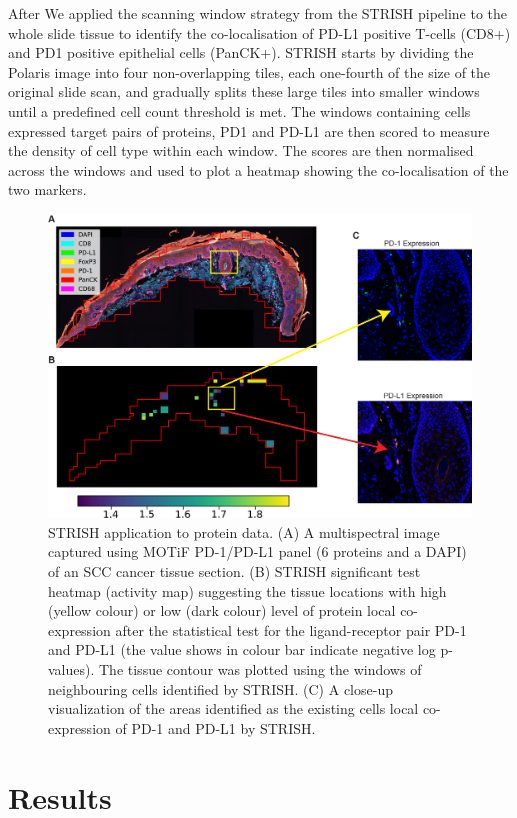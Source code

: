 After  We applied the scanning window strategy from the STRISH pipeline to the whole slide tissue to identify the co-localisation of PD-L1 positive T-cells (CD8+) and PD1 positive epithelial cells (PanCK+). STRISH starts by dividing the Polaris image into four non-overlapping tiles, each one-fourth of the size of the original slide scan, and gradually splits these large tiles into smaller windows until a predefined cell count threshold is met. The windows containing cells expressed target pairs of proteins, PD1 and PD-L1 are then scored to measure the density of cell type within each window. The scores are then normalised across the windows and used to plot a heatmap showing the co-localisation of the two markers.
\begin{figure}[htp]
    \centering
    \includegraphics[width=0.8\columnwidth]{Chapter3/Figures/Chapter2_Fig3.jpg}
    \caption[STRISH application to protein data. ]{STRISH application to protein data. (A) A multispectral image captured using MOTiF PD-1/PD-L1 panel (6 proteins and a DAPI) of an SCC cancer tissue section. (B) STRISH significant test heatmap (activity map) suggesting the tissue locations with high (yellow colour) or low (dark colour) level of protein local co-expression after the statistical test for the ligand-receptor pair PD-1 and PD-L1 (the value shows in colour bar indicate negative log p-values). The tissue contour was plotted using the windows of neighbouring cells identified by STRISH. (C) A close-up visualization of the areas identified as the existing cells local co-expression of PD-1 and PD-L1 by STRISH.}
    \label{fig:Chap2_figure3}
\end{figure}

\section{Results}
